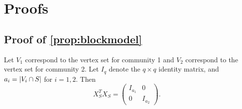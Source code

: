 \appendix

\section{Proofs}



    


\subsection{Proof of \cref{prop:blockmodel}}

    Let $V_1$ correspond to the vertex set for community 1 and $V_2$ correspond to the vertex set for community 2. Let $I_{q}$ denote the $q \times q$ identity matrix, and $a_i = \lvert V_i \cap S\rvert$ for $i = 1, 2$.
    Then $$X_S^T X_S = \begin{pmatrix} I_{a_1} & 0 \\ 0 & I_{a_2} \end{pmatrix}.$$ 

